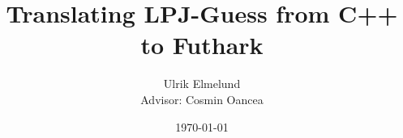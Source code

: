 
\author{Ulrik Elmelund\\ {\small{} Advisor: Cosmin Oancea}}
\date{\today}
\title{Translating LPJ-Guess from C++ to Futhark}









\printbibliography


